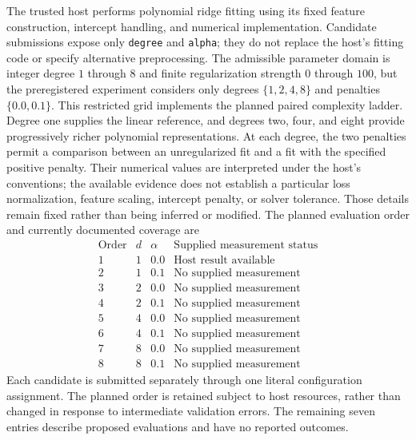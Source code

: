 \documentclass[11pt]{article}
\begin{document}
The trusted host performs polynomial ridge fitting using its fixed feature construction, intercept handling, and numerical implementation. Candidate submissions expose only \texttt{degree} and \texttt{alpha}; they do not replace the host's fitting code or specify alternative preprocessing. The admissible parameter domain is integer degree \(1\) through \(8\) and finite regularization strength \(0\) through \(100\), but the preregistered experiment considers only degrees \(\{1,2,4,8\}\) and penalties \(\{0.0,0.1\}\). This restricted grid implements the planned paired complexity ladder. Degree one supplies the linear reference, and degrees two, four, and eight provide progressively richer polynomial representations. At each degree, the two penalties permit a comparison between an unregularized fit and a fit with the specified positive penalty. Their numerical values are interpreted under the host's conventions; the available evidence does not establish a particular loss normalization, feature scaling, intercept penalty, or solver tolerance. Those details remain fixed rather than being inferred or modified. The planned evaluation order and currently documented coverage are
\[
\begin{array}{c|c|c|l}
\text{Order} & d & \alpha & \text{Supplied measurement status}\\
\hline
1 & 1 & 0.0 & \text{Host result available}\\
2 & 1 & 0.1 & \text{No supplied measurement}\\
3 & 2 & 0.0 & \text{No supplied measurement}\\
4 & 2 & 0.1 & \text{No supplied measurement}\\
5 & 4 & 0.0 & \text{No supplied measurement}\\
6 & 4 & 0.1 & \text{No supplied measurement}\\
7 & 8 & 0.0 & \text{No supplied measurement}\\
8 & 8 & 0.1 & \text{No supplied measurement}
\end{array}
\]
Each candidate is submitted separately through one literal configuration assignment. The planned order is retained subject to host resources, rather than changed in response to intermediate validation errors. The remaining seven entries describe proposed evaluations and have no reported outcomes.
\end{document}
